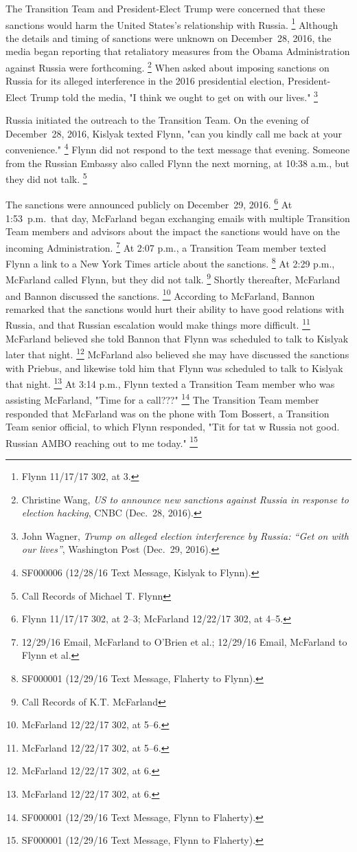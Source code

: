 The Transition Team and President-Elect Trump were concerned that these sanctions would harm the United States's relationship with Russia.%
\footnote{Flynn 11/17/17 302, at 3.}
Although the details and timing of sanctions were unknown on December~28, 2016, the media began reporting that retaliatory measures from the Obama Administration against Russia were forthcoming.%
\footnote{Christine Wang, \textit{US to announce new sanctions against Russia in response to election hacking}, CNBC (Dec.~28, 2016).}
When asked about imposing sanctions on Russia for its alleged interference in the 2016 presidential election, President-Elect Trump told the media, "I think we ought to get on with our lives."%
\footnote{John Wagner, \textit{Trump on alleged election interference by Russia: “Get on with our lives”}, Washington Post (Dec.~29, 2016).}

Russia initiated the outreach to the Transition Team.
On the evening of December~28, 2016, Kislyak texted Flynn, "can you kindly call me back at your convenience."%
\footnote{SF000006 (12/28/16 Text Message, Kislyak to Flynn).}
Flynn did not respond to the text message that evening.
Someone from the Russian Embassy also called Flynn the next morning, at 10:38 a.m., but they did not talk.%
\footnote{Call Records of Michael T. Flynn }

The sanctions were announced publicly on December~29, 2016.%
\footnote{Flynn 11/17/17 302, at 2--3;
McFarland 12/22/17 302, at 4--5.}
At 1:53~p.m.\ that day, McFarland began exchanging emails with multiple Transition Team members and advisors about the impact the sanctions would have on the incoming Administration.%
\footnote{12/29/16 Email, McFarland to O'Brien et al.;
12/29/16 Email, McFarland to Flynn et al.}
At 2:07 p.m., a Transition Team member texted Flynn a link to a New York Times article about the sanctions.%
\footnote{SF000001 (12/29/16 Text Message, Flaherty to Flynn).}
At 2:29 p.m., McFarland called Flynn, but they did not talk.%
\footnote{Call Records of K.T. McFarland }
Shortly thereafter, McFarland and Bannon discussed the sanctions.%
\footnote{McFarland 12/22/17 302, at 5--6.}
According to McFarland, Bannon remarked that the sanctions would hurt their ability to have good relations with Russia, and that Russian escalation would make things more difficult.%
\footnote{McFarland 12/22/17 302, at 5--6.}
McFarland believed she told Bannon that Flynn was scheduled to talk to Kislyak later that night.%
\footnote{McFarland 12/22/17 302, at 6.}
McFarland also believed she may have discussed the sanctions with Priebus, and likewise told him that Flynn was scheduled to talk to Kislyak that night.%
\footnote{McFarland 12/22/17 302, at 6.}
At 3:14 p.m., Flynn texted a Transition Team member who was assisting McFarland, "Time for a call???"%
\footnote{SF000001 (12/29/16 Text Message, Flynn to Flaherty).}
The Transition Team member responded that McFarland was on the phone with Tom Bossert, a Transition Team senior official, to which Flynn responded, "Tit for tat w Russia not good.
Russian AMBO reaching out to me today."%
\footnote{SF000001 (12/29/16 Text Message, Flynn to Flaherty).}

